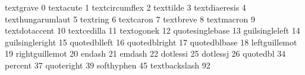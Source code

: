 
\stopmapping

\startencoding[ec][ec] %

 textgrave         0
 textacute         1
 textcircumflex    2
 texttilde         3
 textdiaeresis     4
 texthungarumlaut  5
 textring          6
 textcaron         7
 textbreve         8
 textmacron        9
 textdotaccent    10
 textcedilla      11
 textogonek       12
 quotesinglebase  13
 guilsingleleft   14
 guilsingleright  15
 quotedblleft     16
 quotedblright    17
 quotedblbase     18
 leftguillemot    19
 rightguillemot   20
 endash           21
 emdash           22
 dotlessi         25 %
 dotlessj         26
 quotedbl         34
 percent          37
 quoteright       39
 softhyphen       45
 textbackslash    92
